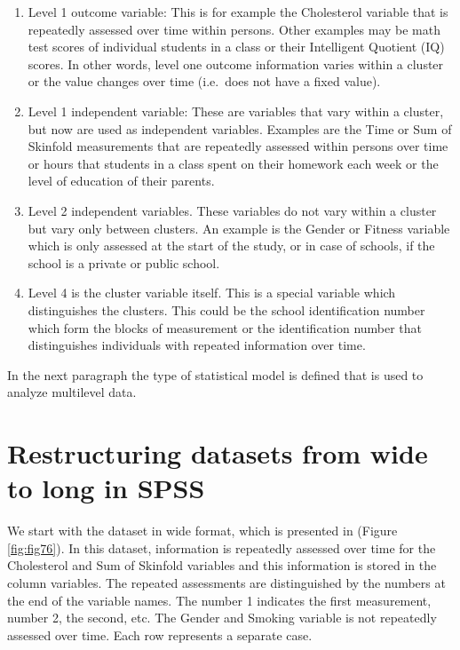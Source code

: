 \documentclass[]{book}
\begin{document}
\begin{enumerate}
\def\labelenumi{\arabic{enumi})}
\item
  Level 1 outcome variable: This is for example the Cholesterol variable
  that is repeatedly assessed over time within persons. Other examples
  may be math test scores of individual students in a class or their
  Intelligent Quotient (IQ) scores. In other words, level one outcome
  information varies within a cluster or the value changes over time
  (i.e.~does not have a fixed value).
\item
  Level 1 independent variable: These are variables that vary within a
  cluster, but now are used as independent variables. Examples are the
  Time or Sum of Skinfold measurements that are repeatedly assessed
  within persons over time or hours that students in a class spent on
  their homework each week or the level of education of their parents.
\item
  Level 2 independent variables. These variables do not vary within a
  cluster but vary only between clusters. An example is the Gender or
  Fitness variable which is only assessed at the start of the study, or
  in case of schools, if the school is a private or public school.
\item
  Level 4 is the cluster variable itself. This is a special variable
  which distinguishes the clusters. This could be the school
  identification number which form the blocks of measurement or the
  identification number that distinguishes individuals with repeated
  information over time.
\end{enumerate}

In the next paragraph the type of statistical model is defined that is
used to analyze multilevel data.

\section{Restructuring datasets from wide to long in
SPSS}\label{restructuring-datasets-from-wide-to-long-in-spss}

We start with the dataset in wide format, which is presented in (Figure
\ref{fig:fig76}). In this dataset, information is repeatedly assessed
over time for the Cholesterol and Sum of Skinfold variables and this
information is stored in the column variables. The repeated assessments
are distinguished by the numbers at the end of the variable names. The
number 1 indicates the first measurement, number 2, the second, etc. The
Gender and Smoking variable is not repeatedly assessed over time. Each
row represents a separate case.
\end{document}
